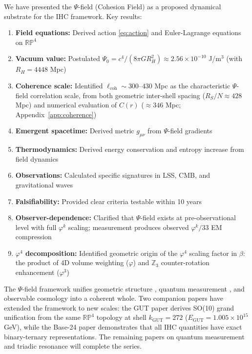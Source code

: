 We have presented the $\Psi$-field (Cohesion Field) as a proposed dynamical substrate for the IHC framework. Key results:

\begin{enumerate}
\item \textbf{Field equations:} Derived action \eqref{eq:action} and Euler-Lagrange equations on $\mathbb{RP}^4$

\item \textbf{Vacuum value:} Postulated $\Psi_0 = c^4/(8\pi GR_H^2) \approx 2.56 \times 10^{-10}$ J/m$^3$ (with $R_H = 4448$ Mpc)

\item \textbf{Coherence scale:} Identified $\ell_{\text{coh}} \sim 300$--$430$ Mpc as the characteristic $\Psi$-field correlation scale, from both geometric inter-shell spacing ($R_S/N \approx 428$ Mpc) and numerical evaluation of $C(r)$ ($\approx 346$ Mpc; Appendix~\ref{app:coherence})

\item \textbf{Emergent spacetime:} Derived metric $g_{\mu\nu}$ from $\Psi$-field gradients

\item \textbf{Thermodynamics:} Derived energy conservation and entropy increase from field dynamics

\item \textbf{Observations:} Calculated specific signatures in LSS, CMB, and gravitational waves

\item \textbf{Falsifiability:} Provided clear criteria testable within 10 years

\item \textbf{Observer-dependence:} Clarified that $\Psi$-field exists at pre-observational level with full $\varphi^k$ scaling; measurement produces observed $\varphi^k/33$ EM compression

\item \textbf{$\varphi^4$ decomposition:} Identified geometric origin of the $\varphi^4$ scaling factor in $\beta$: the product of 4D volume weighting ($\varphi$) and $\mathbb{Z}_3$ counter-rotation enhancement ($\varphi^3$)
\end{enumerate}

The $\Psi$-field framework unifies geometric structure \citep{Peacock2026a}, quantum measurement \citep{Peacock2026b_qm}, and observable cosmology into a coherent whole. Two companion papers have extended the framework to new scales: the GUT paper \citep{Peacock2026c} derives SO(10) grand unification from the same $\mathbb{RP}^4$ topology at shell $k_\mathrm{GUT} = 272$ ($E_\mathrm{GUT} = 1.005 \times 10^{15}$ GeV), while the Base-24 paper \citep{Peacock2026b} demonstrates that all IHC quantities have exact binary-ternary representations. The remaining papers on quantum measurement and triadic resonance will complete the series.

